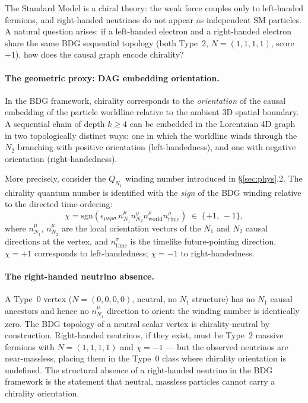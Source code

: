\documentclass[11pt,a4paper]{article}
\begin{document}
The Standard Model is a chiral theory: the weak force couples only to left-handed fermions,
and right-handed neutrinos do not appear as independent SM particles.  A natural question
arises: if a left-handed electron and a right-handed electron share the same BDG sequential
topology (both Type~2, $N=(1,1,1,1)$, score~$+1$), how does the causal graph encode
chirality?

\paragraph{The geometric proxy: DAG embedding orientation.}
In the BDG framework, chirality corresponds to the \emph{orientation} of the causal embedding
of the particle worldline relative to the ambient 3D spatial boundary.  A sequential chain of
depth $k\geq4$ can be embedded in the Lorentzian 4D graph in two topologically distinct ways:
one in which the worldline winds through the $N_2$ branching with positive orientation
(left-handedness), and one with negative orientation (right-handedness).

More precisely, consider the $Q_{N_1}$ winding number introduced in \S\ref{sec:phys}.2.  The
chirality quantum number is identified with the \emph{sign} of the BDG winding relative to the
directed time-ordering:
\begin{equation}
  \chi = \mathrm{sgn}\!\left(\epsilon_{\mu\nu\rho\sigma}\,
  n^\mu_{N_1} n^\nu_{N_2} n^\rho_{\mathrm{world}} n^\sigma_{\mathrm{time}}\right)
  \;\in\; \{+1,\,-1\},
  \label{eq:chi}
\end{equation}
where $n^\mu_{N_1}$, $n^\mu_{N_2}$ are the local orientation vectors of the $N_1$ and $N_2$
causal directions at the vertex, and $n^\sigma_{\mathrm{time}}$ is the timelike future-pointing
direction.  $\chi=+1$ corresponds to left-handedness; $\chi=-1$ to right-handedness.

\paragraph{The right-handed neutrino absence.}
A Type~0 vertex ($N=(0,0,0,0)$, neutral, no $N_1$ structure) has no $N_1$ causal ancestors
and hence no $n^\mu_{N_1}$ direction to orient: the winding number is identically zero.
The BDG topology of a neutral scalar vertex is chirality-neutral by construction.  Right-handed
neutrinos, if they exist, must be Type~2 massive fermions with $N=(1,1,1,1)$ and $\chi=-1$
--- but the observed neutrinos are near-massless, placing them in the Type~0 class where
chirality orientation is undefined.  The structural absence of a right-handed neutrino in the
BDG framework is the statement that neutral, massless particles cannot carry a chirality
orientation.
\end{document}
